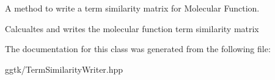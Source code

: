 A method to write a term similarity matrix for Molecular Function. 

Calcualtes and writes the molecular function term similarity matrix 

The documentation for this class was generated from the following file\+:\begin{DoxyCompactItemize}
\item 
ggtk/Term\+Similarity\+Writer.\+hpp\end{DoxyCompactItemize}
